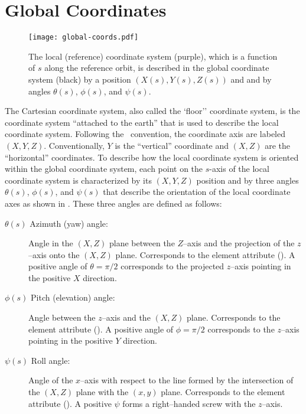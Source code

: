 \section{Global Coordinates}
\label{s:global}

\begin{figure}[tb]
  \centering
  \texttt{[image: global-coords.pdf]}
  \caption[The Global Coordinate System]{
The local (reference) coordinate system (purple), which is a function of $s$ along the reference
orbit, is described in the global coordinate system (black) by a position $(X(s), Y(s), Z(s))$ and
and by angles $\theta(s)$, $\phi(s)$, and $\psi(s)$.
  }
  \label{f:global.coords}
\end{figure}

The Cartesian  coordinate system, also called the `floor'' coordinate system, is the
coordinate system ``attached to the earth'' that is used to describe the local coordinate
system. Following the \mad\ convention, the  coordinate axis are labeled $(X, Y,
Z)$. Conventionally, $Y$ is the ``vertical'' coordinate and $(X, Z)$ are the ``horizontal''
coordinates. To describe how the local coordinate system is oriented within the global coordinate
system, each point on the $s$-axis of the local coordinate system is characterized by its $(X, Y,
Z)$ position and by three angles $\theta(s)$, $\phi(s)$, and $\psi(s)$ that describe the orientation
of the local coordinate axes as shown in . These three angles are defined as
follows:
\begin{description}
%
\item[$\theta(s)$ Azimuth (yaw) angle:] 
Angle in the $(X, Z)$ plane between the $Z$--axis and the projection of the $z$--axis onto the $(X,
Z)$ plane. Corresponds to the  element attribute (). A positive angle of
$\theta = \pi/2$ corresponds to the projected $z$--axis pointing in the positive $X$ direction.
%
\item[$\phi(s)$ Pitch (elevation) angle:] 
Angle between the $z$--axis and the $(X,Z)$ plane. Corresponds to the  element attribute
(). A positive angle of $\phi = \pi/2$ corresponds to the $z$--axis pointing in the
positive $Y$ direction.
%
\item[$\psi(s)$ Roll angle:] 
Angle of the $x$--axis with respect to the line formed by the intersection of the $(X, Z)$ plane
with the $(x, y)$ plane. Corresponds to the  element attribute (). A
positive $\psi$ forms a right--handed screw with the $z$--axis.
\end{description}

